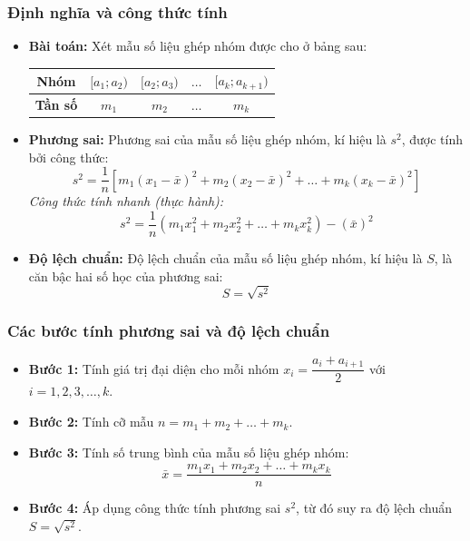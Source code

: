 \documentclass[12pt]{article}
\begin{document}
	\subsubsection{Định nghĩa và công thức tính}
	\begin{itemize}
		\item \textbf{Bài toán:} Xét mẫu số liệu ghép nhóm được cho ở bảng sau:
		\begin{center}
			\renewcommand{\arraystretch}{1.3}
			\begin{tabular}{|c|c|c|c|c|}
				\hline
				\textbf{Nhóm} & $[a_1; a_2)$ & $[a_2; a_3)$ & $\dots$ & $[a_k; a_{k+1})$ \\
				\hline
				\textbf{Tần số} & $m_1$ & $m_2$ & $\dots$ & $m_k$ \\
				\hline
			\end{tabular}
		\end{center}
		
		\item \textbf{Phương sai:} Phương sai của mẫu số liệu ghép nhóm, kí hiệu là $s^2$, được tính bởi công thức:
		\[ s^2 = \frac{1}{n} \left[ m_1(x_1 - \bar{x})^2 + m_2(x_2 - \bar{x})^2 + \dots + m_k(x_k - \bar{x})^2 \right] \]
		\textit{Công thức tính nhanh (thực hành):}
		\[ s^2 = \frac{1}{n} \left( m_1x_1^2 + m_2x_2^2 + \dots + m_kx_k^2 \right) - (\bar{x})^2 \]
		
		\item \textbf{Độ lệch chuẩn:} Độ lệch chuẩn của mẫu số liệu ghép nhóm, kí hiệu là $S$, là căn bậc hai số học của phương sai:
		\[ S = \sqrt{s^2} \]
	\end{itemize}

	\subsubsection{Các bước tính phương sai và độ lệch chuẩn}
	\begin{itemize}
		\item \textbf{Bước 1:} Tính giá trị đại diện cho mỗi nhóm $x_i = \dfrac{a_i + a_{i+1}}{2}$ với $i = 1, 2, 3, \dots, k$.
		\item \textbf{Bước 2:} Tính cỡ mẫu $n = m_1 + m_2 + \dots + m_k$.
		\item \textbf{Bước 3:} Tính số trung bình của mẫu số liệu ghép nhóm: 
		\[ \bar{x} = \frac{m_1x_1 + m_2x_2 + \dots + m_kx_k}{n} \]
		\item \textbf{Bước 4:} Áp dụng công thức tính phương sai $s^2$, từ đó suy ra độ lệch chuẩn $S = \sqrt{s^2}$.
	\end{itemize}
	
\end{document}

